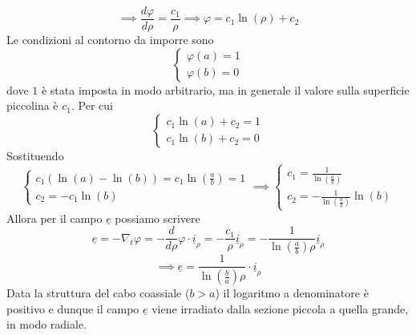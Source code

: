 \documentclass{book}
\begin{document}
        \begin{equation}
            \implies \frac{d \varphi}{d \rho} = \frac{c_{1}}{\rho} \implies \varphi = c_{1} \ln (\rho) + c_{2}
        \end{equation}
        Le condizioni al contorno da imporre sono
        \begin{equation}
            \begin{cases}
            \varphi (a) = 1 \\
            \varphi (b) = 0
            \end{cases}
        \end{equation}
        dove $1$ è stata imposta in modo arbitrario, ma in generale il valore sulla superficie piccolina è $c_{1}$.
        Per cui
        \begin{equation}
            \begin{cases}
                c_{1} \ln (a)+c_{2} = 1 \\
                c_{1} \ln (b)+c_{2} = 0
            \end{cases}
        \end{equation}
        Sostituendo
        \begin{equation}
            \begin{cases}
            c_{1}(\ln(a)-\ln(b)) = c_{1} \ln(\frac{a}{b})= 1 \\
            c_{2} = -c_{1}\ln(b)
            \end{cases} \implies 
            \begin{cases}
            \displaystyle    c_{1} = \frac{1}{\ln (\frac{a}{b})} \\
            \displaystyle    c_{2} = -\frac{1}{\ln(\frac{a}{b})}\ln(b)
            \end{cases}
        \end{equation}
        Allora per il campo $\underline{e}$ possiamo scrivere
        \begin{equation}
            \underline{e} = - \nabla_{t} \varphi = - \frac{d}{d\rho} \varphi \cdot \underline{i}_{\rho} = - \frac{c_{1}}{\rho} \underline{i}_{\rho} = - \frac{1}{\displaystyle \ln(\frac{a}{b}) \rho} \underline{i}_{\rho}
        \end{equation}
        \begin{equation}
        \implies \underline{e} = \frac{1}{\ln (\frac{b}{a})\rho} \cdot \underline{i}_{\rho}
        \end{equation}
        Data la struttura del cabo coassiale ($b>a$) il logaritmo a denominatore è positivo e dunque il campo $\underline{e}$ viene irradiato dalla sezione piccola a quella grande, in modo radiale.
\end{document}
